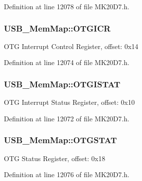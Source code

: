 Definition at line 12078 of file M\+K20\+D7.\+h.

\subsubsection[{\texorpdfstring{O\+T\+G\+I\+CR}{OTGICR}}]{ U\+S\+B\+\_\+\+Mem\+Map\+::\+O\+T\+G\+I\+CR}\hypertarget{struct_u_s_b___mem_map_a4cd829d73e01b3cf0a4fa9affedb210f}{}\label{struct_u_s_b___mem_map_a4cd829d73e01b3cf0a4fa9affedb210f}
O\+TG Interrupt Control Register, offset\+: 0x14 

Definition at line 12074 of file M\+K20\+D7.\+h.

\subsubsection[{\texorpdfstring{O\+T\+G\+I\+S\+T\+AT}{OTGISTAT}}]{ U\+S\+B\+\_\+\+Mem\+Map\+::\+O\+T\+G\+I\+S\+T\+AT}\hypertarget{struct_u_s_b___mem_map_a6eacb73f23f815f7686f4e7bf7eb2fcc}{}\label{struct_u_s_b___mem_map_a6eacb73f23f815f7686f4e7bf7eb2fcc}
O\+TG Interrupt Status Register, offset\+: 0x10 

Definition at line 12072 of file M\+K20\+D7.\+h.

\subsubsection[{\texorpdfstring{O\+T\+G\+S\+T\+AT}{OTGSTAT}}]{ U\+S\+B\+\_\+\+Mem\+Map\+::\+O\+T\+G\+S\+T\+AT}\hypertarget{struct_u_s_b___mem_map_a0398fe890efd8110f3d182e7fcb8a0c5}{}\label{struct_u_s_b___mem_map_a0398fe890efd8110f3d182e7fcb8a0c5}
O\+TG Status Register, offset\+: 0x18 

Definition at line 12076 of file M\+K20\+D7.\+h.

